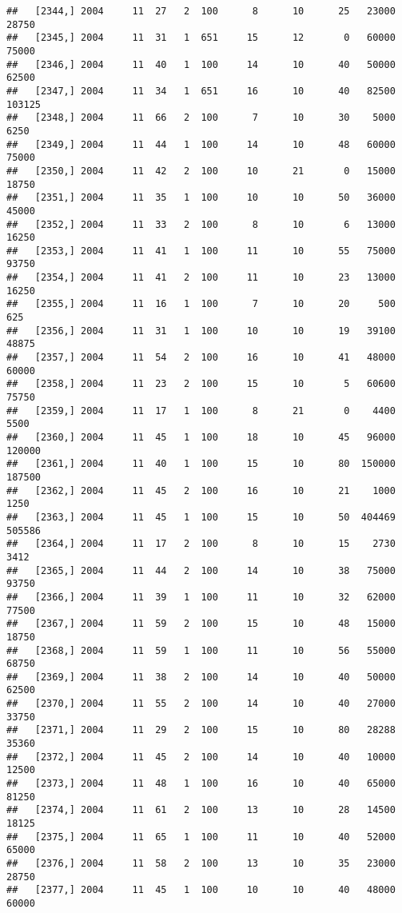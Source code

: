 \documentclass{article}\usepackage[]{graphicx}\usepackage[]{color}
\makeatletter
\newenvironment{kframe}{%
 \def\at@end@of@kframe{}%
 \ifinner\ifhmode%
  \def\at@end@of@kframe{\end{minipage}}%
  \begin{minipage}{\columnwidth}%
 \fi\fi%
 \def\FrameCommand##1{\hskip\@totalleftmargin \hskip-\fboxsep
 \colorbox{shadecolor}{##1}\hskip-\fboxsep
     \hskip-\linewidth \hskip-\@totalleftmargin \hskip\columnwidth}%
 \MakeFramed {\advance\hsize-\width
   \@totalleftmargin\z@ \linewidth\hsize
   \@setminipage}}%
 {\par\unskip\endMakeFramed%
 \at@end@of@kframe}
\newenvironment{knitrout}{}{} %
\makeatother
\begin{document}
\begin{knitrout}
\begin{kframe}
\begin{verbatim}
##   [2344,] 2004     11  27   2  100      8      10      25   23000   28750
##   [2345,] 2004     11  31   1  651     15      12       0   60000   75000
##   [2346,] 2004     11  40   1  100     14      10      40   50000   62500
##   [2347,] 2004     11  34   1  651     16      10      40   82500  103125
##   [2348,] 2004     11  66   2  100      7      10      30    5000    6250
##   [2349,] 2004     11  44   1  100     14      10      48   60000   75000
##   [2350,] 2004     11  42   2  100     10      21       0   15000   18750
##   [2351,] 2004     11  35   1  100     10      10      50   36000   45000
##   [2352,] 2004     11  33   2  100      8      10       6   13000   16250
##   [2353,] 2004     11  41   1  100     11      10      55   75000   93750
##   [2354,] 2004     11  41   2  100     11      10      23   13000   16250
##   [2355,] 2004     11  16   1  100      7      10      20     500     625
##   [2356,] 2004     11  31   1  100     10      10      19   39100   48875
##   [2357,] 2004     11  54   2  100     16      10      41   48000   60000
##   [2358,] 2004     11  23   2  100     15      10       5   60600   75750
##   [2359,] 2004     11  17   1  100      8      21       0    4400    5500
##   [2360,] 2004     11  45   1  100     18      10      45   96000  120000
##   [2361,] 2004     11  40   1  100     15      10      80  150000  187500
##   [2362,] 2004     11  45   2  100     16      10      21    1000    1250
##   [2363,] 2004     11  45   1  100     15      10      50  404469  505586
##   [2364,] 2004     11  17   2  100      8      10      15    2730    3412
##   [2365,] 2004     11  44   2  100     14      10      38   75000   93750
##   [2366,] 2004     11  39   1  100     11      10      32   62000   77500
##   [2367,] 2004     11  59   2  100     15      10      48   15000   18750
##   [2368,] 2004     11  59   1  100     11      10      56   55000   68750
##   [2369,] 2004     11  38   2  100     14      10      40   50000   62500
##   [2370,] 2004     11  55   2  100     14      10      40   27000   33750
##   [2371,] 2004     11  29   2  100     15      10      80   28288   35360
##   [2372,] 2004     11  45   2  100     14      10      40   10000   12500
##   [2373,] 2004     11  48   1  100     16      10      40   65000   81250
##   [2374,] 2004     11  61   2  100     13      10      28   14500   18125
##   [2375,] 2004     11  65   1  100     11      10      40   52000   65000
##   [2376,] 2004     11  58   2  100     13      10      35   23000   28750
##   [2377,] 2004     11  45   1  100     10      10      40   48000   60000

\end{verbatim}
\end{kframe}
\end{knitrout}
\end{document}
